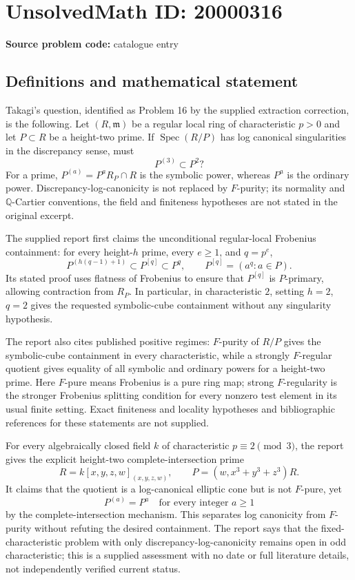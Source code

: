 \documentclass[11pt]{article}
\newcommand{\Q}{\mathbb{Q}}
\begin{document}
\section*{UnsolvedMath ID: 20000316}
\textbf{Source problem code:} catalogue entry
\subsection{Definitions and mathematical statement}
Takagi's question, identified as Problem 16 by the supplied extraction correction, is the following. Let $(R,\mathfrak m)$ be a regular local ring of characteristic $p>0$ and let $P\subset R$ be a height-two prime. If $\operatorname{Spec}(R/P)$ has log canonical singularities in the discrepancy sense, must
\[
 P^{(3)}\subset P^2?
\]
For a prime, $P^{(a)}=P^aR_P\cap R$ is the symbolic power, whereas $P^a$ is the ordinary power. Discrepancy-log-canonicity is not replaced by $F$-purity; its normality and $\Q$-Cartier conventions, the field and finiteness hypotheses are not stated in the original excerpt.

The supplied report first claims the unconditional regular-local Frobenius containment: for every height-$h$ prime, every $e\geq1$, and $q=p^e$,
\[
 P^{(h(q-1)+1)}\subset P^{[q]}\subset P^q,
 \qquad P^{[q]}=(a^q:a\in P).
\]
Its stated proof uses flatness of Frobenius to ensure that $P^{[q]}$ is $P$-primary, allowing contraction from $R_P$. In particular, in characteristic $2$, setting $h=2$, $q=2$ gives the requested symbolic-cube containment without any singularity hypothesis.

The report also cites published positive regimes: $F$-purity of $R/P$ gives the symbolic-cube containment in every characteristic, while a strongly $F$-regular quotient gives equality of all symbolic and ordinary powers for a height-two prime. Here $F$-pure means Frobenius is a pure ring map; strong $F$-regularity is the stronger Frobenius splitting condition for every nonzero test element in its usual finite setting. Exact finiteness and locality hypotheses and bibliographic references for these statements are not supplied.

For every algebraically closed field $k$ of characteristic $p\equiv2\pmod3$, the report gives the explicit height-two complete-intersection prime
\[
 R=k[x,y,z,w]_{(x,y,z,w)},\qquad
 P=(w,x^3+y^3+z^3)R.
\]
It claims that the quotient is a log-canonical elliptic cone but is not $F$-pure, yet
\[
 P^{(a)}=P^a\quad\text{for every integer }a\geq1
\]
by the complete-intersection mechanism. This separates log canonicity from $F$-purity without refuting the desired containment. The report says that the fixed-characteristic problem with only discrepancy-log-canonicity remains open in odd characteristic; this is a supplied assessment with no date or full literature details, not independently verified current status.
\end{document}

